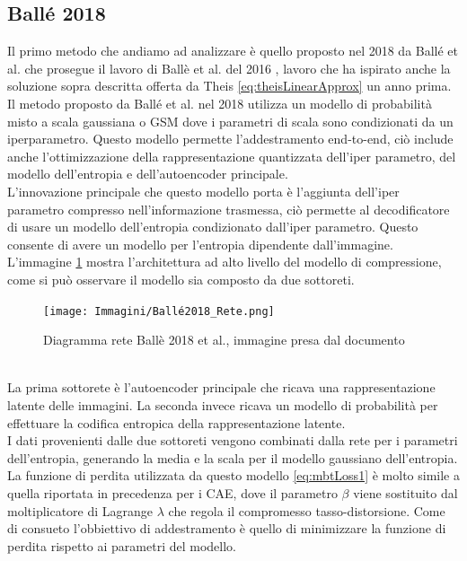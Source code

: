 \subsection{Ballé 2018}
Il primo metodo che andiamo ad analizzare è quello proposto nel 2018 da Ballé et al. \cite{minnen2018joint} che prosegue il lavoro di Ballè et al. del 2016 \cite{balle2018variational}, lavoro che ha ispirato anche la soluzione sopra descritta offerta da Theis \ref{eq:theisLinearApprox} un anno prima.\\
Il metodo proposto da Ballé et al. nel 2018 utilizza un modello di probabilità misto a scala gaussiana o GSM dove i parametri di scala sono condizionati da un iperparametro. Questo modello permette l’addestramento end-to-end, ciò include anche l’ottimizzazione della rappresentazione quantizzata dell’iper parametro, del modello dell’entropia e dell’autoencoder principale.\\
L’innovazione principale che questo modello porta è l’aggiunta dell’iper parametro compresso nell’informazione trasmessa, ciò permette al decodificatore di usare un modello dell’entropia condizionato dall’iper parametro. Questo consente di avere un modello per l’entropia dipendente dall’immagine.\\
L’immagine \ref{fig:balle2018Network} mostra l’architettura ad alto livello del modello di compressione, come si può osservare il modello sia composto da due sottoreti.
\begin{figure}[!h]
    \centering
    \texttt{[image: Immagini/Ballé2018\_Rete.png]}
    \caption{Diagramma rete Ballè 2018 et al., immagine presa dal documento \cite{minnen2018joint}}
    \label{fig:balle2018Network}
\end{figure}\\
La prima sottorete è l’autoencoder principale che ricava una rappresentazione latente delle immagini. La seconda invece ricava un modello di probabilità per effettuare la codifica entropica della rappresentazione latente.\\
I dati provenienti dalle due sottoreti vengono combinati dalla rete per i parametri dell’entropia, generando la media e la scala per il modello gaussiano dell’entropia.\\
La funzione di perdita utilizzata da questo modello \ref{eq:mbtLoss1} è molto simile a quella riportata in precedenza per i CAE, dove il parametro $\beta$ viene sostituito dal moltiplicatore di Lagrange $\lambda$ che regola il compromesso tasso-distorsione. Come di consueto l’obbiettivo di addestramento è quello di minimizzare la funzione di perdita rispetto ai parametri del modello.\\

